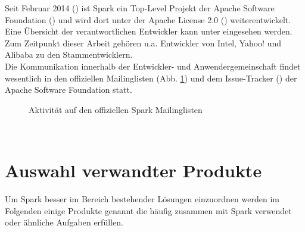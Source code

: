 Seit Februar 2014 (\cite{apacheblog}) ist Spark ein Top-Level Projekt der Apache Software Foundation (\cite{apache}) und wird dort unter der Apache License 2.0 (\cite{apachelic}) weiterentwickelt.\\

Eine Übersicht der verantwortlichen Entwickler kann unter \cite{committer} eingesehen werden.
Zum Zeitpunkt dieser Arbeit gehören u.a. Entwickler von Intel, Yahoo! und Alibaba zu den Stammentwicklern.\\

Die Kommunikation innerhalb der Entwickler- und Anwendergemeinschaft findet wesentlich in den offiziellen Mailinglisten (Abb. \ref{fig:mailinglisten}) und dem Issue-Tracker (\cite{issuetracker}) der Apache Software Foundation statt.

\begin{figure}[ht!]
	\centering
	\caption{Aktivität auf den offiziellen Spark Mailinglisten}
	\label{fig:mailinglisten}
\end{figure}
\\

\section{Auswahl verwandter Produkte}
Um Spark besser im Bereich bestehender Lösungen einzuordnen werden im Folgenden einige Produkte genannt die häufig zusammen mit Spark verwendet oder ähnliche Aufgaben erfüllen.
